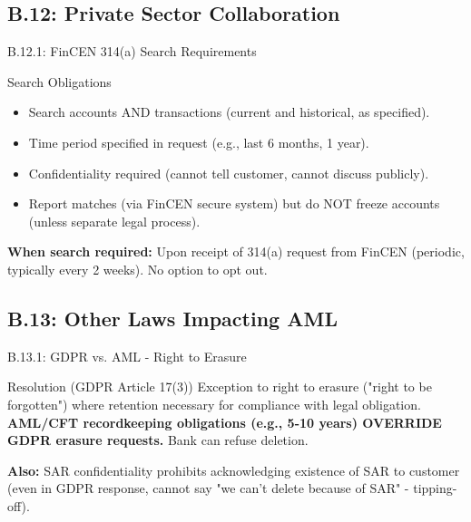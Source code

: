 \documentclass{beamer}
\begin{document}
	\subsection{B.12: Private Sector Collaboration}
	
	\begin{frame}{B.12.1: FinCEN 314(a) Search Requirements}
		\begin{block}{Search Obligations}
			\begin{itemize}
				\item Search accounts AND transactions (current and historical, as specified).
				\item Time period specified in request (e.g., last 6 months, 1 year).
				\item Confidentiality required (cannot tell customer, cannot discuss publicly).
				\item Report matches (via FinCEN secure system) but do NOT freeze accounts (unless separate legal process).
			\end{itemize}
		\end{block}
		\textbf{When search required:} Upon receipt of 314(a) request from FinCEN (periodic, typically every 2 weeks). No option to opt out.
	\end{frame}
	
	\subsection{B.13: Other Laws Impacting AML}
	
	\begin{frame}{B.13.1: GDPR vs. AML - Right to Erasure}
		\begin{block}{Resolution (GDPR Article 17(3))}
			Exception to right to erasure ("right to be forgotten") where retention necessary for compliance with legal obligation.
			\vspace{0.2cm}
			\textbf{AML/CFT recordkeeping obligations (e.g., 5-10 years) OVERRIDE GDPR erasure requests.} Bank can refuse deletion.
		\end{block}
		\textbf{Also:} SAR confidentiality prohibits acknowledging existence of SAR to customer (even in GDPR response, cannot say "we can't delete because of SAR" - tipping-off).
	\end{frame}
	
	
\end{document}
